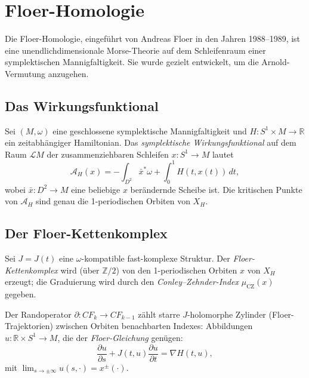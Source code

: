 \documentclass[12pt,a4paper]{amsart}
\theoremstyle{definition}
\begin{document}
\section{Floer-Homologie}
\label{sec:floer}

Die Floer-Homologie, eingeführt von Andreas Floer in den Jahren 1988--1989,
ist eine unendlichdimensionale Morse-Theorie auf dem Schleifenraum einer
symplektischen Mannigfaltigkeit.  Sie wurde gezielt entwickelt, um die
Arnold-Vermutung anzugehen.

\subsection{Das Wirkungsfunktional}

Sei $(M, \omega)$ eine geschlossene symplektische Mannigfaltigkeit und
$H: S^1 \times M \to \mathbb{R}$ ein zeitabhängiger Hamiltonian.  Das
\emph{symplektische Wirkungsfunktional} auf dem Raum $\mathcal{L}M$ der
zusammenziehbaren Schleifen $x: S^1 \to M$ lautet
\begin{equation}\label{eq:wirkung}
  \mathcal{A}_H(x) = -\int_{D^2} \bar{x}^*\omega + \int_0^1 H(t, x(t))\,dt,
\end{equation}
wobei $\bar{x}: D^2 \to M$ eine beliebige $x$ berändernde Scheibe ist.  Die
kritischen Punkte von $\mathcal{A}_H$ sind genau die 1-periodischen Orbiten
von $X_H$.

\subsection{Der Floer-Kettenkomplex}

Sei $J = J(t)$ eine $\omega$-kompatible fast-komplexe Struktur.  Der
\emph{Floer-Kettenkomplex} wird (über $\mathbb{Z}/2$) von den 1-periodischen
Orbiten $x$ von $X_H$ erzeugt; die Graduierung wird durch den
\emph{Conley--Zehnder-Index} $\mu_{\mathrm{CZ}}(x)$ gegeben.

Der Randoperator $\partial: CF_k \to CF_{k-1}$ zählt starre $J$-holomorphe
Zylinder (Floer-Trajektorien) zwischen Orbiten benachbarten Indexes:
Abbildungen $u: \mathbb{R} \times S^1 \to M$, die der \emph{Floer-Gleichung}
genügen:
\begin{equation}\label{eq:floer}
  \frac{\partial u}{\partial s} + J(t, u)\frac{\partial u}{\partial t} =
  \nabla H(t, u),
\end{equation}
mit $\lim_{s \to \pm\infty} u(s,\cdot) = x^\pm(\cdot)$.
\end{document}
